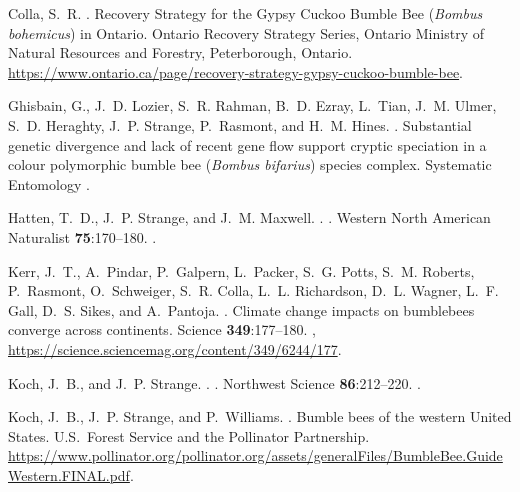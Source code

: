 \begin{multicols}{2}
\begin{thebibliography}{24}
Colla, S.~R.
.
\newblock Recovery Strategy for the Gypsy Cuckoo Bumble Bee (\textit{Bombus
  bohemicus}) in Ontario.
\newblock Ontario Recovery Strategy Series, Ontario Ministry of Natural
  Resources and Forestry, Peterborough, Ontario.
\newblock
  \urlprefix\url{https://www.ontario.ca/page/recovery-strategy-gypsy-cuckoo-bumble-bee}.

Ghisbain, G., J.~D. Lozier, S.~R. Rahman, B.~D. Ezray, L.~Tian, J.~M. Ulmer,
  S.~D. Heraghty, J.~P. Strange, P.~Rasmont, and H.~M. Hines.
.
\newblock Substantial genetic divergence and lack of recent gene flow support
  cryptic speciation in a colour polymorphic bumble bee (\textit{Bombus
  bifarius}) species complex.
\newblock Systematic Entomology .

Hatten, T.~D., J.~P. Strange, and J.~M. Maxwell.
.
.
\newblock Western North American Naturalist {\bfseries 75}:170--180.
\newblock {}.

Kerr, J.~T., A.~Pindar, P.~Galpern, L.~Packer, S.~G. Potts, S.~M. Roberts,
  P.~Rasmont, O.~Schweiger, S.~R. Colla, L.~L. Richardson, D.~L. Wagner, L.~F.
  Gall, D.~S. Sikes, and A.~Pantoja.
.
\newblock Climate change impacts on bumblebees converge across continents.
\newblock Science {\bfseries 349}:177--180.
\newblock {},
  \urlprefix\url{https://science.sciencemag.org/content/349/6244/177}.

Koch, J.~B., and J.~P. Strange.
.
.
\newblock Northwest Science {\bfseries 86}:212--220.
\newblock {}.

Koch, J.~B., J.~P. Strange, and P.~Williams.
.
\newblock Bumble bees of the western United States.
\newblock U.S.\ Forest Service and the Pollinator Partnership.
\newblock
  \urlprefix\url{https://www.pollinator.org/pollinator.org/assets/generalFiles/BumbleBee.GuideWestern.FINAL.pdf}.


\end{thebibliography}
\end{multicols}
